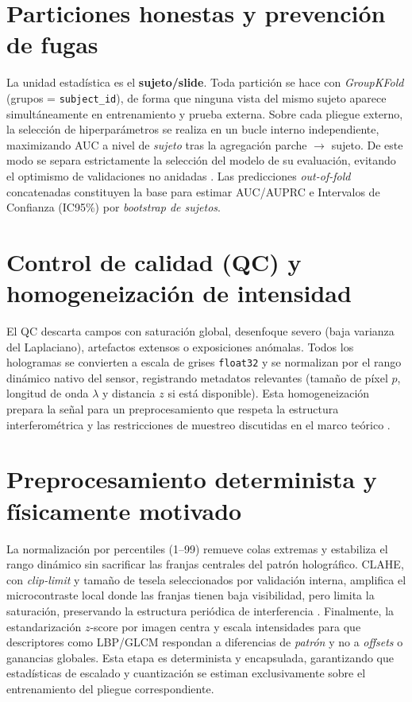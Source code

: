 \section*{Particiones honestas y prevención de fugas}
La unidad estadística es el \textbf{sujeto/slide}. Toda partición se hace con \emph{GroupKFold} (grupos = \texttt{subject\_id}), de forma que ninguna vista del mismo sujeto aparece simultáneamente en entrenamiento y prueba externa. Sobre cada pliegue externo, la selección de hiperparámetros se realiza en un bucle interno independiente, maximizando AUC a nivel de \emph{sujeto} tras la agregación parche $\rightarrow$ sujeto. De este modo se separa estrictamente la selección del modelo de su evaluación, evitando el optimismo de validaciones no anidadas \cite{Tsamardinos2022Patterns}. Las predicciones \emph{out-of-fold} concatenadas constituyen la base para estimar AUC/AUPRC e Intervalos de Confianza (IC95\%) por \emph{bootstrap de sujetos}.

\section*{Control de calidad (QC) y homogeneización de intensidad}
El QC descarta campos con saturación global, desenfoque severo (baja varianza del Laplaciano), artefactos extensos o exposiciones anómalas. Todos los hologramas se convierten a escala de grises \texttt{float32} y se normalizan por el rango dinámico nativo del sensor, registrando metadatos relevantes (tamaño de píxel $p$, longitud de onda $\lambda$ y distancia $z$ si está disponible). Esta homogeneización prepara la señal para un preprocesamiento que respeta la estructura interferométrica y las restricciones de muestreo discutidas en el marco teórico \cite{Chen2022Photonics}.

\section*{Preprocesamiento determinista y físicamente motivado}
La normalización por percentiles (1–99) remueve colas extremas y estabiliza el rango dinámico sin sacrificar las franjas centrales del patrón holográfico. CLAHE, con \emph{clip-limit} y tamaño de tesela seleccionados por validación interna, amplifica el microcontraste local donde las franjas tienen baja visibilidad, pero limita la saturación, preservando la estructura periódica de interferencia \cite{Zhou2019MedImageContrast}. Finalmente, la estandarización $z$-score por imagen centra y escala intensidades para que descriptores como LBP/GLCM respondan a diferencias de \emph{patrón} y no a \emph{offsets} o ganancias globales. Esta etapa es determinista y encapsulada, garantizando que estadísticas de escalado y cuantización se estiman exclusivamente sobre el entrenamiento del pliegue correspondiente.

